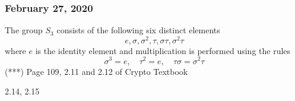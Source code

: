 \subsubsection*{February 27, 2020}
\exercise The group $S_3$ consists of the following six distinct elements
\[e, \sigma, \sigma^2, \tau, \sigma\tau, \sigma^2\tau\]
where $e$ is the identity element and multiplication is performed using the rules
\[\sigma^3=e, \quad \tau^2=e, \quad \tau\sigma = \sigma^2\tau\]
(***) Page 109, 2.11 and 2.12 of Crypto Textbook

2.14, 2.15